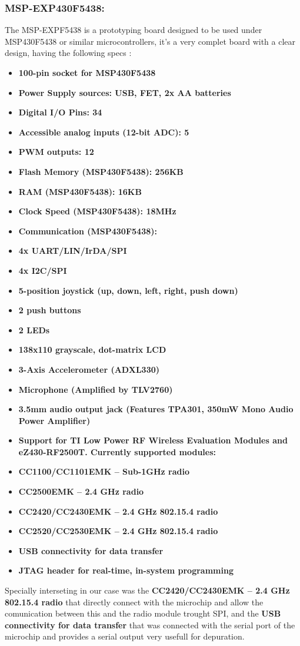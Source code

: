 		\subsubsection{MSP-EXP430F5438:}
		\label{it:MSP-EXP430F5438}
		The MSP-EXPF5438 is a prototyping board designed to be used under MSP430F5438 or similar microcontrollers, it's a very complet board with a clear design, having the following specs \cite{5438aboard}:
		\begin{itemize}
			\item \textbf{100-pin socket for MSP430F5438}
			\item \textbf{Power Supply sources: USB, FET, 2x AA batteries}
			\item \textbf{Digital I/O Pins: 34}
			\item \textbf{Accessible analog inputs (12-bit ADC): 5}
			\item \textbf{PWM outputs: 12}
			\item \textbf{Flash Memory (MSP430F5438): 256KB}
			\item \textbf{RAM (MSP430F5438): 16KB}
			\item \textbf{Clock Speed (MSP430F5438): 18MHz}
			\item \textbf{Communication (MSP430F5438):}
			\item \textbf{4x UART/LIN/IrDA/SPI}
			\item \textbf{4x I2C/SPI}
			\item \textbf{5-position joystick (up, down, left, right, push down)}
			\item \textbf{2 push buttons}
			\item \textbf{2 LEDs}
			\item \textbf{138x110 grayscale, dot-matrix LCD}
			\item \textbf{3-Axis Accelerometer (ADXL330)}
			\item \textbf{Microphone (Amplified by TLV2760)}
			\item \textbf{3.5mm audio output jack (Features TPA301, 350mW Mono Audio Power Amplifier)}
			\item \textbf{Support for TI Low Power RF Wireless Evaluation Modules and eZ430-RF2500T. Currently supported modules:}
			\item \textbf{CC1100/CC1101EMK – Sub-1GHz radio}
			\item \textbf{CC2500EMK – 2.4 GHz radio}
			\item \textbf{CC2420/CC2430EMK – 2.4 GHz 802.15.4 radio}
			\item \textbf{CC2520/CC2530EMK – 2.4 GHz 802.15.4 radio}
			\item \textbf{USB connectivity for data transfer}
			\item \textbf{JTAG header for real-time, in-system programming}
		\end{itemize}
		Specially interseting in our case was the \textbf{CC2420/CC2430EMK – 2.4 GHz 802.15.4 radio} that directly connect with the microchip and allow the comunication between this and the radio module trought SPI, and the \textbf{USB connectivity for data transfer} that was connected with the serial port of the microchip and provides a serial output very usefull for depuration.\\

